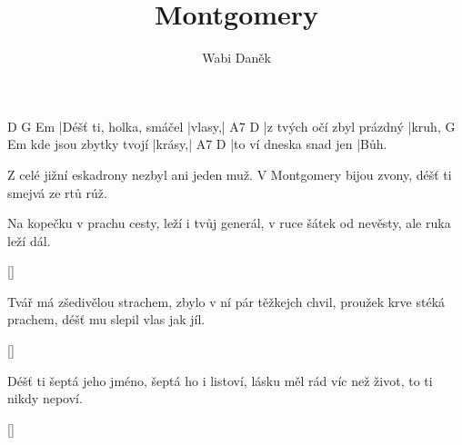 \documentclass{song}
\title{Montgomery}
\author{Wabi Daněk}
\begin{document}
\strophe
D                       G      Em
|Déšť ti, holka, smáčel |vlasy,|
A7                        D
|z tvých očí zbyl prázdný |kruh,
                      G      Em
kde jsou zbytky tvojí |krásy,|
A7                     D
|to ví dneska snad jen |Bůh.
\endstrophe

Z celé jižní eskadrony
nezbyl ani jeden muž.
V Montgomery bijou zvony,
déšť ti smejvá ze rtů rúž.
\endstrophe

\strophe
Na kopečku v prachu cesty,
leží i tvůj generál,
v ruce šátek od nevěsty,
ale ruka leží dál.
\endstrophe

\ref{}

\strophe*
Tvář má zšedivělou strachem,
zbylo v ní pár těžkejch chvil,
proužek krve stéká prachem,
déšť mu slepil vlas jak jíl.
\endstrophe

\ref{}

\strophe*
Déšť ti šeptá jeho jméno,
šeptá ho i listoví,
lásku měl rád víc než život,
to ti nikdy nepoví.
\endstrophe

\ref{}
\end{document}
